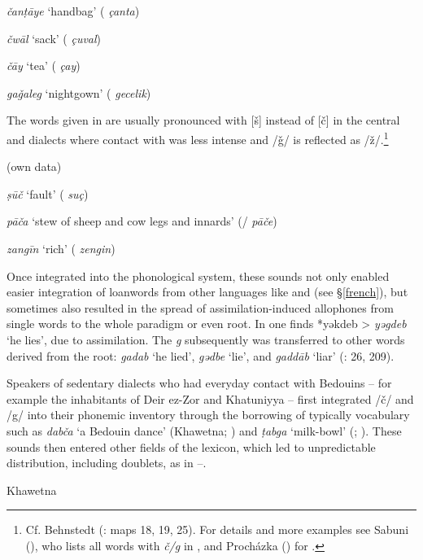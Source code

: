 \documentclass[output=paper]{langsci/langscibook}
\begin{document}
\textit{čanṭāye} ‘handbag’ ( \textit{çanta})

\textit{čwāl} ‘sack’ ( \textit{çuval})

\textit{čāy} ‘tea’ ( \textit{çay})

\textit{gaǧaleg} ‘nightgown’ ( \textit{gecelik})
\z

The words given in  are usually pronounced with [š] instead of [č] in the central  and  dialects where contact with  was less intense and /ǧ/ is reflected as /ž/.\footnote{Cf. Behnstedt (\citeyear{Behnstedt1997}: maps 18, 19, 25). For details and more examples see Sabuni (\citeyear[205--210]{Sabuni1980}), who lists all words with \textit{č/g} in , and Procházka (\citeyear[185]{Procházka2002Adana}) for  .}

\ea\label{Mosul}
 (own data)

\textit{ṣūč} ‘fault’ ( \textit{suç})

\textit{pāča} ‘stew of sheep and cow legs and innards’ (/ \textit{pāče})

\textit{zangīn} ‘rich’ ( \textit{zengin})
\z

Once integrated into the phonological system, these sounds not only enabled easier integration of {loanwords} from other languages like  and  (see §\ref{french}), but sometimes also resulted in the spread of assimilation-induced allophones from single words to the whole paradigm or even {root}. In  one finds *yəkdeb > \textit{yəgdeb} ‘he lies’, due to assimilation. The \textit{g} subsequently was transferred to other words derived from the {root}: \textit{gadab} ‘he lied’, \textit{gədbe} ‘lie’, and \textit{gaddāb} ‘liar’ (\citealt{Sabuni1980}: 26, 209). 

Speakers of sedentary dialects who had everyday contact with Bedouins – for example the inhabitants of Deir ez-Zor and Khatuniyya – first integrated /č/ and /g/ into their phonemic inventory through the borrowing of typically  vocabulary such as \textit{dabča} ‘a Bedouin dance’ (Khawetna; \citealt[29]{Talay1999}) and \textit{ṭabga} ‘milk-bowl’ (; \citealt[310]{Behnstedt1994Soukhne}). These sounds then entered other fields of the lexicon, which led to unpredictable distribution, including doublets, as in --.

\ea\label{Khawetna} Khawetna \citep[28--31]{Talay1999}  
\end{document}

